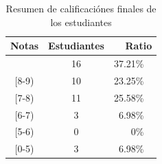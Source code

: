 \begin{table}[h]
\centering
\begin{tabular}{|c|c|r|}
\hline
\textbf{Notas} & \textbf{Estudiantes} & \textbf{Ratio}   \\ \hline
\hline
 [9-10] & 16 & 37.21\% ~ \\ \hline
 [8-9) & 10 & 23.25\% ~ \\ \hline
 [7-8) & 11 & 25.58\% ~ \\ \hline
 [6-7) & 3 & 6.98\% ~ \\ \hline
 [5-6) & 0 & 0\% ~ \\ \hline
 [0-5) & 3 & 6.98\% ~ \\ \hline
\end{tabular}
\caption{Resumen de calificaciónes finales de los estudiantes}
\label{table:summary-theory}
\end{table}




